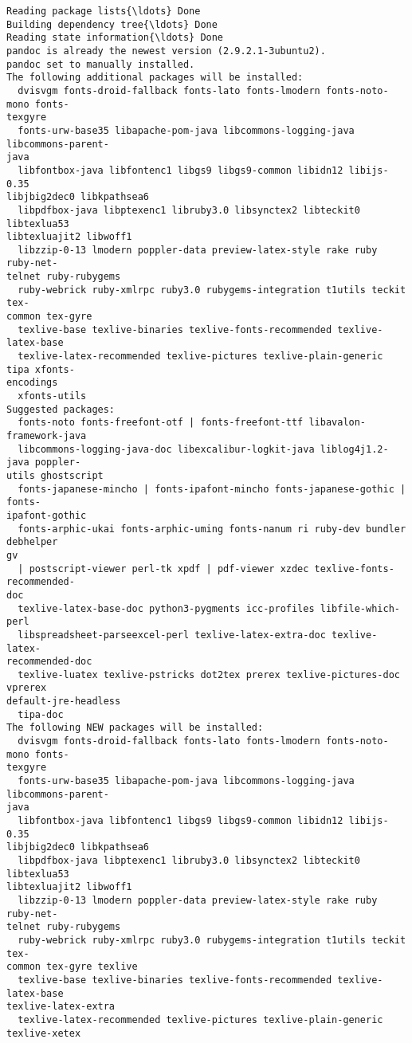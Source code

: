 \documentclass[11pt]{article}
\begin{document}
    \begin{Verbatim}[commandchars=\\\{\}]
Reading package lists{\ldots} Done
Building dependency tree{\ldots} Done
Reading state information{\ldots} Done
pandoc is already the newest version (2.9.2.1-3ubuntu2).
pandoc set to manually installed.
The following additional packages will be installed:
  dvisvgm fonts-droid-fallback fonts-lato fonts-lmodern fonts-noto-mono fonts-
texgyre
  fonts-urw-base35 libapache-pom-java libcommons-logging-java libcommons-parent-
java
  libfontbox-java libfontenc1 libgs9 libgs9-common libidn12 libijs-0.35
libjbig2dec0 libkpathsea6
  libpdfbox-java libptexenc1 libruby3.0 libsynctex2 libteckit0 libtexlua53
libtexluajit2 libwoff1
  libzzip-0-13 lmodern poppler-data preview-latex-style rake ruby ruby-net-
telnet ruby-rubygems
  ruby-webrick ruby-xmlrpc ruby3.0 rubygems-integration t1utils teckit tex-
common tex-gyre
  texlive-base texlive-binaries texlive-fonts-recommended texlive-latex-base
  texlive-latex-recommended texlive-pictures texlive-plain-generic tipa xfonts-
encodings
  xfonts-utils
Suggested packages:
  fonts-noto fonts-freefont-otf | fonts-freefont-ttf libavalon-framework-java
  libcommons-logging-java-doc libexcalibur-logkit-java liblog4j1.2-java poppler-
utils ghostscript
  fonts-japanese-mincho | fonts-ipafont-mincho fonts-japanese-gothic | fonts-
ipafont-gothic
  fonts-arphic-ukai fonts-arphic-uming fonts-nanum ri ruby-dev bundler debhelper
gv
  | postscript-viewer perl-tk xpdf | pdf-viewer xzdec texlive-fonts-recommended-
doc
  texlive-latex-base-doc python3-pygments icc-profiles libfile-which-perl
  libspreadsheet-parseexcel-perl texlive-latex-extra-doc texlive-latex-
recommended-doc
  texlive-luatex texlive-pstricks dot2tex prerex texlive-pictures-doc vprerex
default-jre-headless
  tipa-doc
The following NEW packages will be installed:
  dvisvgm fonts-droid-fallback fonts-lato fonts-lmodern fonts-noto-mono fonts-
texgyre
  fonts-urw-base35 libapache-pom-java libcommons-logging-java libcommons-parent-
java
  libfontbox-java libfontenc1 libgs9 libgs9-common libidn12 libijs-0.35
libjbig2dec0 libkpathsea6
  libpdfbox-java libptexenc1 libruby3.0 libsynctex2 libteckit0 libtexlua53
libtexluajit2 libwoff1
  libzzip-0-13 lmodern poppler-data preview-latex-style rake ruby ruby-net-
telnet ruby-rubygems
  ruby-webrick ruby-xmlrpc ruby3.0 rubygems-integration t1utils teckit tex-
common tex-gyre texlive
  texlive-base texlive-binaries texlive-fonts-recommended texlive-latex-base
texlive-latex-extra
  texlive-latex-recommended texlive-pictures texlive-plain-generic texlive-xetex

\end{Verbatim}
\end{document}
